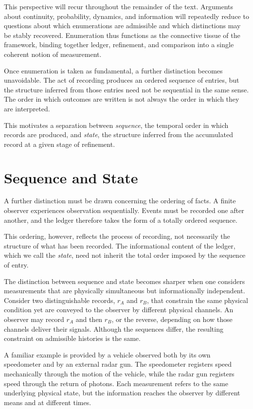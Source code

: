 This perspective will recur throughout the remainder of the text. Arguments
about continuity, probability, dynamics, and information will repeatedly reduce
to questions about which enumerations are admissible and which distinctions may
be stably recovered. Enumeration thus functions as the connective tissue of the
framework, binding together ledger, refinement, and comparison into a single
coherent notion of measurement.

Once enumeration is taken as fundamental, a further distinction becomes
unavoidable. The act of recording produces an ordered sequence of entries, but
the structure inferred from those entries need not be sequential in the same
sense. The order in which outcomes are written is not always the order in which
they are interpreted.

This motivates a separation between \emph{sequence}, the temporal order in which
records are produced, and \emph{state}, the structure inferred from the
accumulated record at a given stage of refinement.

\section{Sequence and State}
\label{sec:sequence-state}

A further distinction must be drawn concerning the ordering of facts. A finite
observer experiences observation sequentially. Events must be recorded one
after another, and the ledger therefore takes the form of a totally ordered
sequence.

This ordering, however, reflects the process of recording, not necessarily the
structure of what has been recorded. The informational content of the ledger,
which we call the \emph{state}, need not inherit the total order imposed by the
sequence of entry.

The distinction between sequence and state becomes sharper when one considers
measurements that are physically simultaneous but informationally independent.
Consider two distinguishable records, $r_A$ and $r_B$, that constrain the same
physical condition yet are conveyed to the observer by different physical
channels. An observer may record $r_A$ and then $r_B$, or the reverse, depending
on how those channels deliver their signals. Although the sequences differ, the
resulting constraint on admissible histories is the same.

A familiar example is provided by a vehicle observed both by its own
speedometer and by an external radar gun. The speedometer registers speed
mechanically through the motion of the vehicle, while the radar gun registers
speed through the return of photons. Each measurement refers to the same
underlying physical state, but the information reaches the observer by different
means and at different times.

